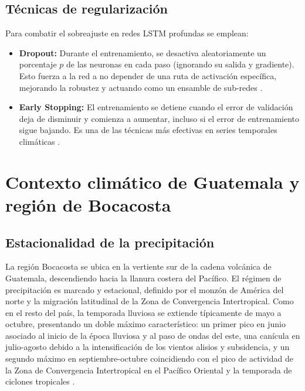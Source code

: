 \subsection{Técnicas de regularización}
Para combatir el sobreajuste en redes LSTM profundas se emplean:
\begin{itemize}
    \item \textbf{Dropout:} Durante el entrenamiento, se desactiva aleatoriamente un porcentaje \(p\) de las neuronas en cada paso (ignorando su salida y gradiente). Esto fuerza a la red a no depender de una ruta de activación específica, mejorando la robustez y actuando como un ensamble de sub-redes \citep{JMLR:dropout}.
    \item \textbf{Early Stopping:} El entrenamiento se detiene cuando el error de validación deja de disminuir y comienza a aumentar, incluso si el error de entrenamiento sigue bajando. Es una de las técnicas más efectivas en series temporales climáticas \citep{NeuralNetworkArchitectures}.
\end{itemize}

\section{Contexto climático de Guatemala y región de Bocacosta}

\subsection{Estacionalidad de la precipitación}
La región Bocacosta se ubica en la vertiente sur de la cadena volcánica de Guatemala, descendiendo hacia la llanura costera del Pacífico. El régimen de precipitación es marcado y estacional, definido por el monzón de América del norte y la migración latitudinal de la Zona de Convergencia Intertropical. Como en el resto del país, la temporada lluviosa se extiende típicamente de mayo a octubre, presentando un doble máximo característico: un primer pico en junio asociado al inicio de la época lluviosa y al paso de ondas del este, una canícula en julio-agosto debido a la intensificación de los vientos alisios y subsidencia, y un segundo máximo en septiembre-octubre coincidiendo con el pico de actividad de la Zona de Convergencia Intertropical en el Pacífico Oriental y la temporada de ciclones tropicales \citep{atmosferica1986viento, herrera2017descripcion}.

